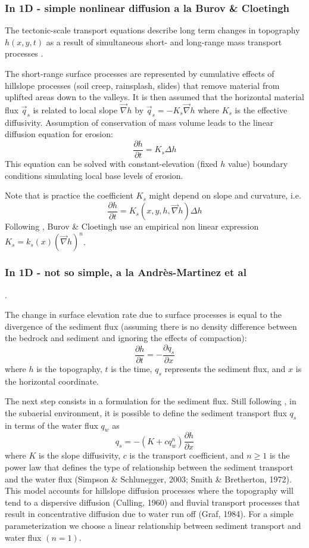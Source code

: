 \subsubsection{In 1D - simple nonlinear diffusion a la Burov \& Cloetingh \cite{bucl97}}

The tectonic-scale transport equations describe long term changes
in topography $h(x,y,t)$ as a result of simultaneous short- and long-range
mass transport processes \cite{befh92,kobe94}.

The short-range surface processes are represented by cumulative effects of hillslope 
processes (soil creep, rainsplash, slides) that remove material from uplifted areas 
down to the valleys. 
It is then assumed that the horizontal material flux $\vec{q}_s$ is related to 
local slope $\vec\nabla h$ by $\vec{q}_s=-K_s \vec{\nabla}h$ 
where $K_s$ is the effective diffusivity. Assumption of conservation of mass 
volume leads to the linear diffusion equation for erosion:
\[
\frac{\partial h}{\partial t} = K_s \Delta h
\]
This equation can be solved with constant-elevation (fixed $h$ value)
boundary conditions simulating local base levels of erosion. 

Note that is practice the coefficient $K_s$ might depend on slope and curvature, 
i.e.
\[
\frac{\partial h}{\partial t} = K_s(x,y,h,\vec\nabla h)\Delta h
\]
Following \cite{goss76}, Burov \& Cloetingh use an empirical non linear 
expression $K_s=k_s(x) (\vec\nabla h)^n$. 




\subsubsection{In 1D - not so simple, a la Andr\`es-Martinez et al\cite{anpa19}}. 

The change in surface elevation rate due to surface processes is equal
to the divergence of the sediment flux 
(assuming there is no density difference between the bedrock and
sediment and ignoring the effects of compaction):
\[
\frac{\partial h}{\partial t} = -\frac{\partial q_s}{\partial x}
\]
where $h$ is the topography, $t$ is the time, $q_s$ represents the sediment flux, 
and $x$ is the horizontal coordinate. 

The next step consists in a formulation for the sediment flux. Still following \cite{anpa19}, 
in the subaerial environment, it is possible to define the sediment transport 
flux $q_s$ in terms of the water flux $q_w$ as
\[
q_s=-(K+c q_w^n) \frac{\partial h}{\partial x}
\]
where $K$ is the slope diffusivity, $c$ is the transport coefficient, 
and $n \geq 1$ is the power law that defines the type
of relationship between the sediment transport and the water flux 
(Simpson \& Schlunegger, 2003; Smith \& Bretherton, 1972).
This model accounts for hillslope diffusion processes where the topography will tend to
a dispersive diffusion (Culling, 1960) and fluvial transport processes that result in concentrative diffusion
due to water run off (Graf, 1984). For a simple parameterization we choose a linear relationship between
sediment transport and water flux $(n=1)$.

